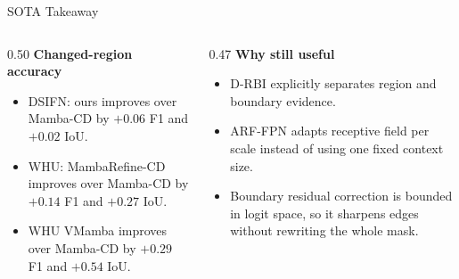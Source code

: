 \begin{frame}{SOTA Takeaway}
    \begin{columns}[T,onlytextwidth]
        \begin{column}{0.50\textwidth}
            \small
            \textbf{Changed-region accuracy}
            \begin{itemize}
                \item DSIFN: ours improves over Mamba-CD by \(+0.06\) F1 and \(+0.02\) IoU.
                \item WHU: MambaRefine-CD improves over Mamba-CD by \(+0.14\) F1 and \(+0.27\) IoU.
                \item WHU VMamba improves over Mamba-CD by \(+0.29\) F1 and \(+0.54\) IoU.
            \end{itemize}
        \end{column}
        \begin{column}{0.47\textwidth}
            \small
            \textbf{Why still useful}
            \begin{itemize}
                \item D-RBI explicitly separates region and boundary evidence.
                \item ARF-FPN adapts receptive field per scale instead of using one fixed context size.
                \item Boundary residual correction is bounded in logit space, so it sharpens edges without rewriting the whole mask.
            \end{itemize}
        \end{column}
    \end{columns}
\end{frame}
